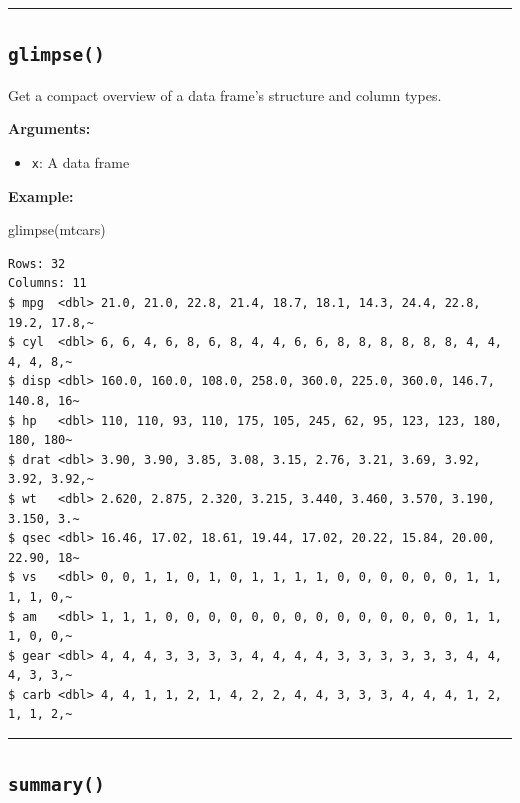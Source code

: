 \documentclass[
  letterpaper,
  DIV=11,
  numbers=noendperiod]{scrreprt}
\newenvironment{Shaded}{\begin{snugshade}}{\end{snugshade}}
\newcommand{\FunctionTok}[1]{\textcolor[rgb]{0.28,0.35,0.67}{#1}}
\newcommand{\NormalTok}[1]{\textcolor[rgb]{0.00,0.23,0.31}{#1}}
\providecommand{\tightlist}{%
  \setlength{\itemsep}{0pt}\setlength{\parskip}{0pt}}
\begin{document}
\begin{center}\rule{0.5\linewidth}{0.5pt}\end{center}

\subsection{\texorpdfstring{\texttt{glimpse()}}{glimpse()}}\label{glimpse}

Get a compact overview of a data frame's structure and column types.

\textbf{Arguments:}

\begin{itemize}
\tightlist
\item
  \texttt{x}: A data frame
\end{itemize}

\textbf{Example:}

\begin{Shaded}
\begin{Highlighting}[]
\FunctionTok{glimpse}\NormalTok{(mtcars)}
\end{Highlighting}
\end{Shaded}

\begin{verbatim}
Rows: 32
Columns: 11
$ mpg  <dbl> 21.0, 21.0, 22.8, 21.4, 18.7, 18.1, 14.3, 24.4, 22.8, 19.2, 17.8,~
$ cyl  <dbl> 6, 6, 4, 6, 8, 6, 8, 4, 4, 6, 6, 8, 8, 8, 8, 8, 8, 4, 4, 4, 4, 8,~
$ disp <dbl> 160.0, 160.0, 108.0, 258.0, 360.0, 225.0, 360.0, 146.7, 140.8, 16~
$ hp   <dbl> 110, 110, 93, 110, 175, 105, 245, 62, 95, 123, 123, 180, 180, 180~
$ drat <dbl> 3.90, 3.90, 3.85, 3.08, 3.15, 2.76, 3.21, 3.69, 3.92, 3.92, 3.92,~
$ wt   <dbl> 2.620, 2.875, 2.320, 3.215, 3.440, 3.460, 3.570, 3.190, 3.150, 3.~
$ qsec <dbl> 16.46, 17.02, 18.61, 19.44, 17.02, 20.22, 15.84, 20.00, 22.90, 18~
$ vs   <dbl> 0, 0, 1, 1, 0, 1, 0, 1, 1, 1, 1, 0, 0, 0, 0, 0, 0, 1, 1, 1, 1, 0,~
$ am   <dbl> 1, 1, 1, 0, 0, 0, 0, 0, 0, 0, 0, 0, 0, 0, 0, 0, 0, 1, 1, 1, 0, 0,~
$ gear <dbl> 4, 4, 4, 3, 3, 3, 3, 4, 4, 4, 4, 3, 3, 3, 3, 3, 3, 4, 4, 4, 3, 3,~
$ carb <dbl> 4, 4, 1, 1, 2, 1, 4, 2, 2, 4, 4, 3, 3, 3, 4, 4, 4, 1, 2, 1, 1, 2,~
\end{verbatim}

\begin{center}\rule{0.5\linewidth}{0.5pt}\end{center}

\subsection{\texorpdfstring{\texttt{summary()}}{summary()}}\label{summary-11}
\end{document}
